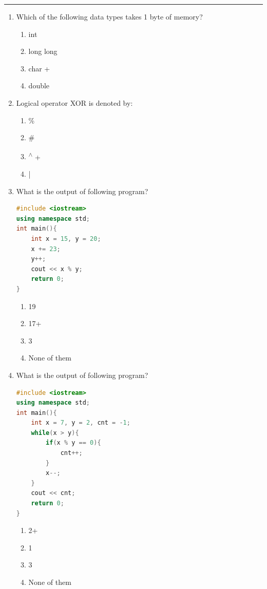 \documentclass[11pt]{article}
\begin{document}
\medskip\hrule
\begin{enumerate}

\item Which of the following data types takes 1 byte of memory?
\begin{enumerate}
    \item int
    \item long long
    \item char +
    \item double
\end{enumerate}

\item Logical operator XOR is denoted by:
\begin{enumerate}
    \item \%
    \item \#
    \item \textsuperscript{$\wedge$} +
    \item |
\end{enumerate}


\item What is the output of following program?
\begin{lstlisting}[language=C++]
#include <iostream>
using namespace std;
int main(){
    int x = 15, y = 20;
    x += 23;
    y++;
    cout << x % y;
    return 0;
}

\end{lstlisting}
\begin{enumerate}
    \item 19
    \item 17+
    \item 3
    \item None of them
\end{enumerate}

\item What is the output of following program?
\begin{lstlisting}[language=C++]
#include <iostream>
using namespace std;
int main(){
    int x = 7, y = 2, cnt = -1;
    while(x > y){
        if(x % y == 0){
            cnt++;
        }
        x--;
    }
    cout << cnt;
    return 0;
}
\end{lstlisting}
\begin{enumerate}
    \item 2+
    \item 1
    \item 3
    \item None of them
\end{enumerate}


\end{enumerate}
\end{document}
